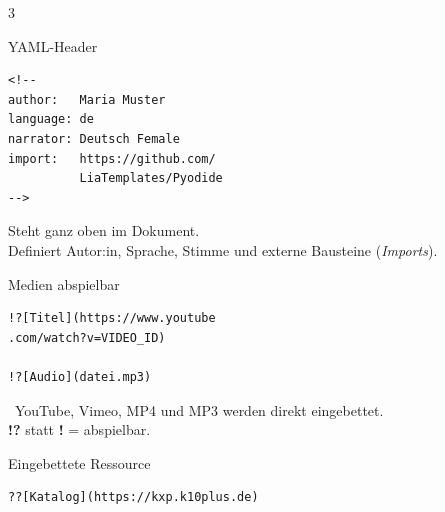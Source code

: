 \documentclass[a4paper,landscape,9pt]{extarticle}
\newcommand{\prevsm}[1]{{\footnotesize\color{muted} #1}}
\begin{document}
\begin{multicols}{3}


\begin{liacard}{YAML-Header}
\begin{lstlisting}[language=lia]
<!--
author:   Maria Muster
language: de
narrator: Deutsch Female
import:   https://github.com/
          LiaTemplates/Pyodide
-->
\end{lstlisting}
\tcblower
\prevsm{Steht ganz oben im Dokument.\\
Definiert Autor:in, Sprache, Stimme
und externe Bausteine (\textit{Imports}).}
\end{liacard}


\begin{liacard}{Medien abspielbar}
\begin{lstlisting}[language=lia]
!?[Titel](https://www.youtube
.com/watch?v=VIDEO_ID)

!?[Audio](datei.mp3)
\end{lstlisting}
\tcblower
\prevsm{\faYoutube~YouTube, Vimeo, MP4
und MP3 werden direkt eingebettet.\\[2pt]
\textbf{!?} statt \textbf{!} = abspielbar.}
\end{liacard}

\begin{liacard}{Eingebettete Ressource}
\begin{lstlisting}[language=lia]
??[Katalog](https://kxp.k10plus.de)


\end{lstlisting}
\end{liacard}
\end{multicols}
\end{document}
